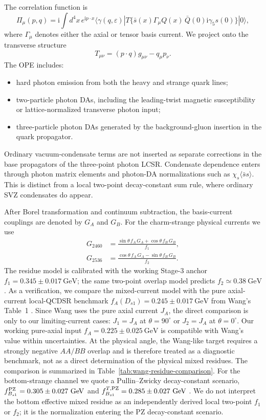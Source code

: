 \documentclass[11pt]{article}
\newcommand{\ii}{\mathrm{i}}
\newcommand{\Bsone}{B_{s1}}
\newcommand{\GeV}{\mathrm{GeV}}
\newcommand{\ssbar}{\langle\bar s s\rangle}
\begin{document}
The correlation function is
\begin{equation}
  \Pi_\mu(p,q)=\ii\int d^4x\,e^{\ii p\cdot x}
  \langle\gamma(q,\varepsilon)|
  T\{\bar s(x)\Gamma_\mu Q(x)\,\bar Q(0)\ii\gamma_5 s(0)\}
  |0\rangle ,
  \label{eq:corr}
\end{equation}
where $\Gamma_\mu$ denotes either the axial or tensor basis current.  We
project onto the transverse structure
\begin{equation}
  T_{\mu\nu}=(p\cdot q)g_{\mu\nu}-q_\mu p_\nu .
\end{equation}
The OPE includes:
\begin{itemize}
  \item hard photon emission from both the heavy and strange quark lines;
  \item two-particle photon DAs, including the leading-twist magnetic
  susceptibility or lattice-normalized transverse photon input;
  \item three-particle photon DAs generated by the background-gluon insertion
  in the quark propagator.
\end{itemize}
Ordinary vacuum-condensate terms are not inserted as separate corrections in
the base propagators of the three-point photon LCSR.  Condensate dependence
enters through photon matrix elements and photon-DA normalizations such as
$\chi_s\ssbar$.  This is distinct from a local two-point decay-constant sum
rule, where ordinary SVZ condensates do appear.

After Borel transformation and continuum subtraction, the basis-current
couplings are denoted by $G_A$ and $G_B$.  For the charm-strange physical
currents we use
\begin{align}
  G_{2460} &=
  \frac{\sin\theta\,f_A\,G_A+\cos\theta\,f_B\,G_B}{f_1},\\
  G_{2536} &=
  \frac{\cos\theta\,f_A\,G_A-\sin\theta\,f_B\,G_B}{f_2}.
  \label{eq:stage3}
\end{align}
The residue model is calibrated with the working Stage-3 anchor
$f_1=0.345\pm0.017~\GeV$; the same two-point overlap model predicts
$f_2\simeq0.38~\GeV$.  As a verification, we compare the mixed-current model
with the pure axial-current local-QCDSR benchmark
$f_A(D_{s1})=0.245\pm0.017~\GeV$ from Wang's Table~1 \cite{Wang2015}.  Since
Wang uses the pure axial current $J_A$, the direct comparison is only to our
limiting-current cases: $J_1=J_A$ at $\theta=90^\circ$ or $J_2=J_A$ at
$\theta=0^\circ$.  Our working pure-axial input
$f_A=0.225\pm0.025~\GeV$ is compatible with Wang's value within uncertainties.
At the physical angle, the Wang-like target requires a strongly negative
$AA/BB$ overlap and is therefore treated as a diagnostic benchmark, not as a
direct determination of the physical mixed residues.  The comparison is
summarized in Table~\ref{tab:wang-residue-comparison}.
For the bottom-strange channel
we quote a Pullin--Zwicky decay-constant scenario,
$f_{\Bsone}^{\rm PZ}=0.305\pm0.027~\GeV$ and
$f_{\Bsone}^{T,\rm PZ}=0.285\pm0.027~\GeV$ \cite{PullinZwicky2021}.  We do not
interpret the bottom effective mixed residue as an independently derived local
two-point $f_1$ or $f_2$; it is the normalization entering the PZ
decay-constant scenario.
\end{document}
